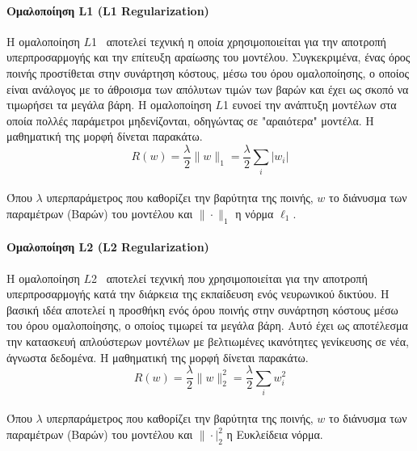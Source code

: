 \documentclass[12pt]{article}
\numberwithin{equation}{section}
\begin{document}
\paragraph{Ομαλοποίηση L1 (L1 Regularization) \\ [0.5 cm]} 
 
Η ομαλοποίηση \(L\)1~\cite{schmidt2009l1} αποτελεί τεχνική η οποία χρησιμοποιείται για την αποτροπή υπερπροσαρμογής και την επίτευξη αραίωσης του μοντέλου. Συγκεκριμένα, ένας όρος ποινής προστίθεται στην συνάρτηση κόστους, μέσω του όρου ομαλοποίησης, ο οποίος είναι ανάλογος με το άθροισμα των απόλυτων τιμών των βαρών και έχει ως σκοπό να τιμωρήσει τα μεγάλα βάρη. Η ομαλοποίηση \(L\)1 ευνοεί την ανάπτυξη μοντέλων στα οποία πολλές παράμετροι μηδενίζονται, οδηγώντας σε "αραιότερα" μοντέλα. Η μαθηματική της μορφή δίνεται παρακάτω.\\

\begin{equation}
R(w) = \frac{\lambda}{2} \|w\|_1 = \frac{\lambda}{2} \sum_i |w_i|
\end{equation}\\

\noindent Όπου \(\lambda\) υπερπαράμετρος που καθορίζει την βαρύτητα της ποινής, \(w\) το διάνυσμα των παραμέτρων (Βαρών) του μοντέλου και \(\|\cdot\|_1\) η νόρμα \(\ell_1\).\\

\paragraph{Ομαλοποίηση L2 (L2 Regularization) \\ [0.5 cm]}

Η ομαλοποίηση \(L\)2~\cite{lewkowycz2021trainingdynamicsdeepnetworks} αποτελεί τεχνική που χρησιμοποιείται για την αποτροπή υπερπροσαρμογής κατά την διάρκεια της εκπαίδευση ενός νευρωνικού δικτύου. Η βασική ιδέα αποτελεί η προσθήκη ενός όρου ποινής στην συνάρτηση κόστους μέσω του όρου ομαλοποίησης, ο οποίος τιμωρεί τα μεγάλα βάρη. Αυτό έχει ως αποτέλεσμα την κατασκευή απλούστερων μοντέλων με βελτιωμένες ικανότητες γενίκευσης σε νέα, άγνωστα δεδομένα. Η μαθηματική της μορφή δίνεται παρακάτω. \\

\begin{equation}
R(w) = \frac{\lambda}{2} \|w\|_2^2 = \frac{\lambda}{2} \sum_i w_i^2
\end{equation}\\

\noindent Όπου \(\lambda\) υπερπαράμετρος που καθορίζει την βαρύτητα της ποινής, \(w\) το διάνυσμα των παραμέτρων (Βαρών)  του μοντέλου και \(\|\cdot|_2^2\) η Ευκλείδεια νόρμα.\\
\end{document}
